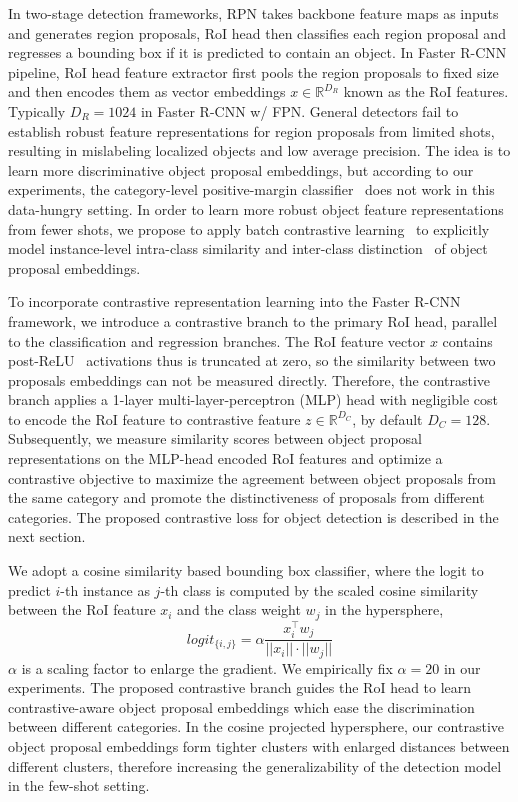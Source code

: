 \documentclass[final]{cvpr}
\begin{document}
In two-stage detection frameworks, RPN takes backbone feature maps as inputs and generates region proposals, RoI head then classifies each region proposal and regresses a bounding box if it is predicted to contain an object. In Faster R-CNN pipeline, RoI head feature extractor first pools the region proposals to fixed size and then encodes them as vector embeddings $x\in\mathbb{R}^{D_{R}}$ known as the RoI features. Typically $D_R=1024$ in Faster R-CNN w/ FPN. General detectors fail to establish robust feature representations for region proposals from limited shots, resulting in mislabeling localized objects and low average precision. The idea is to learn more discriminative object proposal embeddings, but according to our experiments, the category-level positive-margin classifier~\cite{cos_face,deng2009imagenet} does not work in this data-hungry setting. In order to learn more robust object feature representations from fewer shots, we propose to apply batch contrastive learning~\cite{supervised_contrastive_learning} to explicitly model instance-level intra-class similarity and inter-class distinction~\cite{sun2014deep,hadsell2006dimensionality} of object proposal embeddings. 

To incorporate contrastive representation learning into the Faster R-CNN framework, we introduce a contrastive branch to the primary RoI head, parallel to the classification and regression branches. The RoI feature vector $x$ contains post-ReLU~\cite{rectified_nodate} activations thus is truncated at zero, so the similarity between two proposals embeddings can not be measured directly. Therefore, the contrastive branch applies a 1-layer multi-layer-perceptron (MLP) head with negligible cost to encode the RoI feature to contrastive feature $z\in \mathbb{R}^{D_C}$, by default $D_C=128$. Subsequently, we measure similarity scores between object proposal representations on the MLP-head encoded RoI features and optimize a contrastive objective to maximize the agreement between object proposals from the same category and promote the distinctiveness of proposals from different categories. The proposed contrastive loss for object detection is described in the next section.

We adopt a cosine similarity based bounding box classifier, where the logit to predict $i$-th instance as $j$-th class is computed by the scaled cosine similarity between the RoI feature $x_i$ and the class weight $w_j$ in the hypersphere,
\vspace{-1.7mm}
\begin{equation}
	logit_{\{i,j\}} = \alpha\frac{x_i^\top w_j}{||x_i||\cdot||w_j||}
\end{equation}
$\alpha$ is a scaling factor to enlarge the gradient. We empirically fix $\alpha=20$ in our experiments. The proposed contrastive branch guides the RoI head to learn contrastive-aware object proposal embeddings which ease the discrimination between different categories. In the cosine projected hypersphere, our contrastive object proposal embeddings form tighter clusters with enlarged distances between different clusters, therefore increasing the generalizability of the detection model in the few-shot setting.
\end{document}
